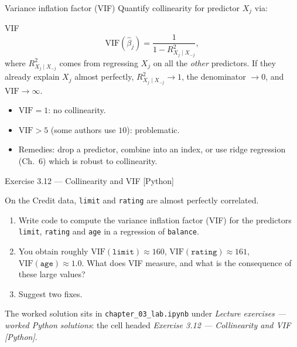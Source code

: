\documentclass[aspectratio=169,11pt]{beamer}
\begin{document}
\begin{frame}{Variance inflation factor (VIF)}\label{frm:vif}
  Quantify collinearity for predictor $X_j$ via:
  \begin{block}{VIF}
    \[
      \mathrm{VIF}(\hat\beta_j) = \frac{1}{1 - R^2_{X_j \mid X_{-j}}},
    \]
    where $R^2_{X_j \mid X_{-j}}$ comes from regressing $X_j$ on all the
    \emph{other} predictors. If they already explain $X_j$ almost
    perfectly, $R^2_{X_j \mid X_{-j}}\to 1$, the denominator $\to 0$, and
    $\mathrm{VIF}\to\infty$.
  \end{block}
  \begin{readme}
    \begin{itemize}
      \item $\mathrm{VIF} = 1$: no collinearity.
      \item $\mathrm{VIF} > 5$ (some authors use $10$): problematic.
      \item Remedies: drop a predictor, combine into an index, or use
            ridge regression (Ch.~6) which is robust to collinearity.
    \end{itemize}
  \end{readme}
\end{frame}


\begin{frame}[fragile]{Exercise 3.12 --- Collinearity and VIF [Python]}
  \begin{exercise}
    On the Credit data, \texttt{limit} and \texttt{rating} are almost
    perfectly correlated.
    \begin{enumerate}
      \item Write code to compute the variance inflation factor (VIF)
            for the predictors \texttt{limit}, \texttt{rating} and
            \texttt{age} in a regression of \texttt{balance}.
      \item You obtain roughly $\mathrm{VIF}(\texttt{limit})\approx 160$,
            $\mathrm{VIF}(\texttt{rating})\approx 161$,
            $\mathrm{VIF}(\texttt{age})\approx 1.0$. What does VIF
            measure, and what is the consequence of these large values?
      \item Suggest two fixes.
    \end{enumerate}
  \end{exercise}
  \begin{labnote}
    The worked solution sits in \texttt{chapter\_03\_lab.ipynb} under
    \emph{Lecture exercises --- worked Python solutions}: the cell headed
    \emph{Exercise 3.12 --- Collinearity and VIF [Python]}.
  \end{labnote}
\end{frame}
\end{document}
